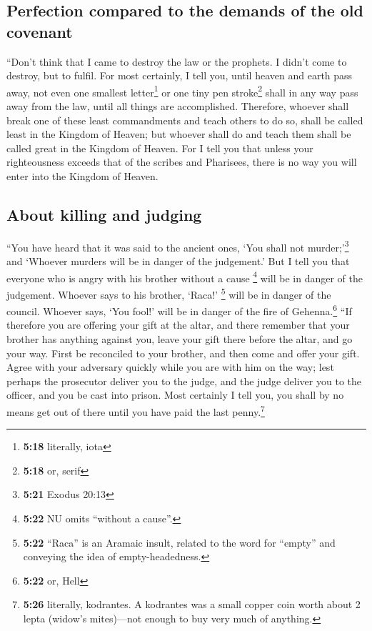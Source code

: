 \hypertarget{perfection-compared-to-the-demands-of-the-old-covenant}{%
\subsection{Perfection compared to the demands of the old
covenant}\label{perfection-compared-to-the-demands-of-the-old-covenant}}

 ``Don't think that I came to destroy the law or the
prophets. I didn't come to destroy, but to fulfil.  For
most certainly, I tell you, until heaven and earth pass away, not even
one smallest letter\footnote{\textbf{5:18} literally, iota} or one tiny
pen stroke\footnote{\textbf{5:18} or, serif} shall in any way pass away
from the law, until all things are accomplished. 
Therefore, whoever shall break one of these least commandments and teach
others to do so, shall be called least in the Kingdom of Heaven; but
whoever shall do and teach them shall be called great in the Kingdom of
Heaven.  For I tell you that unless your righteousness
exceeds that of the scribes and Pharisees, there is no way you will
enter into the Kingdom of Heaven.

\hypertarget{about-killing-and-judging}{%
\subsection{About killing and judging}\label{about-killing-and-judging}}

 ``You have heard that it was said to the ancient ones,
`You shall not murder;'\footnote{\textbf{5:21} Exodus 20:13} and
`Whoever murders will be in danger of the judgement.' 
But I tell you that everyone who is angry with his brother without a
cause \footnote{\textbf{5:22} NU omits ``without a cause''.} will be in
danger of the judgement. Whoever says to his brother, `Raca!'
\footnote{\textbf{5:22} ``Raca'' is an Aramaic insult, related to the
  word for ``empty'' and conveying the idea of empty-headedness.} will
be in danger of the council. Whoever says, `You fool!' will be in danger
of the fire of Gehenna.\footnote{\textbf{5:22} or, Hell} 
``If therefore you are offering your gift at the altar, and there
remember that your brother has anything against you, 
leave your gift there before the altar, and go your way. First be
reconciled to your brother, and then come and offer your gift.
 Agree with your adversary quickly while you are with him
on the way; lest perhaps the prosecutor deliver you to the judge, and
the judge deliver you to the officer, and you be cast into prison.
 Most certainly I tell you, you shall by no means get out
of there until you have paid the last penny.\footnote{\textbf{5:26}
  literally, kodrantes. A kodrantes was a small copper coin worth about
  2 lepta (widow's mites)---not enough to buy very much of anything.}

